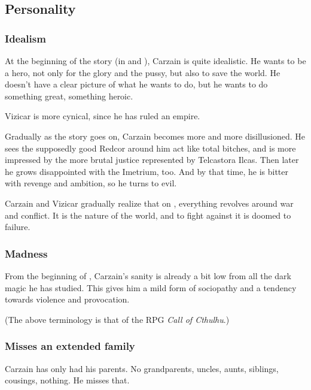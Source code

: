 \subsection{Personality}





\subsubsection{Idealism}
At the beginning of the story (in \emph{\TwilightAngelRemember{}} and \emph{\CarzainWithRedcorBook{}}), Carzain is quite idealistic. He wants to be a hero, not only for the glory and the pussy, but also to save the world. He doesn't have a clear picture of what he wants to do, but he wants to do something great, something heroic. 

Vizicar is more cynical, since he has ruled an empire. 

Gradually as the story goes on, Carzain becomes more and more disillusioned. He sees the supposedly good Redcor around him act like total bitches, and is more impressed by the more brutal justice represented by Telcastora Ilcas. Then later he grows disappointed with the Imetrium, too. And by that time, he is bitter with revenge and ambition, so he turns to evil. 

Carzain and Vizicar gradually realize that on \Miith{}, everything revolves around war and conflict. It is the nature of the world, and to fight against it is doomed to failure. 





\subsubsection{Madness}
From the beginning of \emph{\TwilightAngelRemember{}}, Carzain's sanity is already a bit low from all the dark \nieur{} magic he has studied. 
This gives him a mild form of sociopathy and a tendency towards violence and provocation. 

(The above terminology is that of the RPG \emph{Call of Cthulhu}.)





\subsubsection{Misses an extended family}
Carzain has only had his parents. 
No grandparents, uncles, aunts, siblings, cousings, nothing. 
He misses that. 





